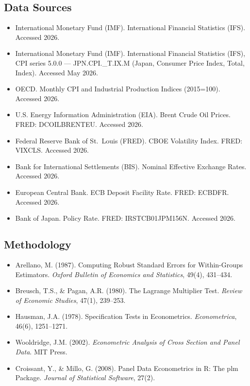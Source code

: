 \documentclass[11pt,a4paper]{article}
\begin{document}
\subsection*{Data Sources}
\begin{itemize}[leftmargin=1.2em,itemsep=2pt]
  \item International Monetary Fund (IMF). International Financial Statistics (IFS). Accessed 2026.
  \item International Monetary Fund (IMF). International Financial Statistics (IFS), CPI series 5.0.0 --- JPN.CPI.\_T.IX.M (Japan, Consumer Price Index, Total, Index). Accessed May 2026.
  \item OECD. Monthly CPI and Industrial Production Indices (2015=100). Accessed 2026.
  \item U.S. Energy Information Administration (EIA). Brent Crude Oil Prices. FRED: DCOILBRENTEU. Accessed 2026.
  \item Federal Reserve Bank of St.\ Louis (FRED). CBOE Volatility Index. FRED: VIXCLS. Accessed 2026.
  \item Bank for International Settlements (BIS). Nominal Effective Exchange Rates. Accessed 2026.
  \item European Central Bank. ECB Deposit Facility Rate. FRED: ECBDFR. Accessed 2026.
  \item Bank of Japan. Policy Rate. FRED: IRSTCB01JPM156N. Accessed 2026.
\end{itemize}
\subsection*{Methodology}
\begin{itemize}[leftmargin=1.2em,itemsep=2pt]
  \item Arellano, M. (1987). Computing Robust Standard Errors for Within-Groups Estimators. \textit{Oxford Bulletin of Economics and Statistics}, 49(4), 431--434.
  \item Breusch, T.S., \& Pagan, A.R. (1980). The Lagrange Multiplier Test. \textit{Review of Economic Studies}, 47(1), 239--253.
  \item Hausman, J.A. (1978). Specification Tests in Econometrics. \textit{Econometrica}, 46(6), 1251--1271.
  \item Wooldridge, J.M. (2002). \textit{Econometric Analysis of Cross Section and Panel Data}. MIT Press.
  \item Croissant, Y., \& Millo, G. (2008). Panel Data Econometrics in R: The plm Package. \textit{Journal of Statistical Software}, 27(2).
\end{itemize}
\end{document}
